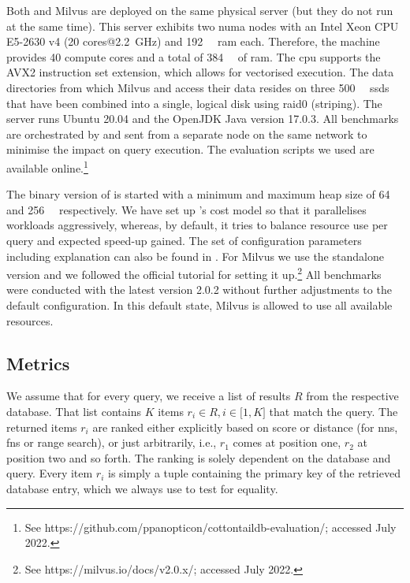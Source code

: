 Both \cottontail{} and Milvus are deployed on the same physical server (but they do not run at the same time). This server exhibits two \acrshort{numa} nodes with an Intel Xeon CPU E5-2630 v4 (20 cores@\SI{2.2}{\giga\hertz}) and \SI{192}{\giga\byte} \acrshort{ram} each. Therefore, the machine provides 40 compute cores and a total of \SI{384}{\giga\byte} of \acrshort{ram}. The \acrshort{cpu} supports the AVX2 instruction set extension, which allows for vectorised execution. The data directories from which Milvus and \cottontail{} access their data resides on three \SI{500}{\giga\byte} \acrshort{ssd}s that have been combined into a single, logical disk using \acrshort{raid}0 (striping). The server runs Ubuntu 20.04 and the OpenJDK Java version 17.0.3. All benchmarks are orchestrated by and sent from a separate node on the same network to minimise the impact on query execution. The evaluation scripts we used are available online.\footnote{See https://github.com/ppanopticon/cottontaildb-evaluation/; accessed July 2022.}

The binary version of \cottontail{} is started with a minimum and maximum heap size of \SI{64}{\giga\byte} and \SI{256}{\giga\byte} respectively. We have set up \cottontail{}'s cost model so that it parallelises workloads aggressively, whereas, by default, it tries to balance resource use per query and expected speed-up gained. The set of configuration parameters including explanation can also be found in . For Milvus we use the standalone version and we followed the official tutorial for setting it up.\footnote{See https://milvus.io/docs/v2.0.x/; accessed July 2022.} All benchmarks were conducted with the latest version 2.0.2 without further adjustments to the default configuration. In this default state, Milvus is allowed to use all available resources.

\subsection{Metrics}

We assume that for every query, we receive a list of results $R$ from the respective database. That list contains $K$ items $r_i \in R, i \in \lbrack 1, K  \rbrack $ that match the query. The returned items $r_i$ are ranked either explicitly based on score or distance (for \acrshort{nns}, \acrshort{fns} or range search), or just arbitrarily, i.e., $r_1$ comes at position one, $r_2$ at position two and so forth. The ranking is solely dependent on the database and query. Every item $r_i$ is simply a tuple containing the primary key of the retrieved database entry, which we always use to test for equality.

